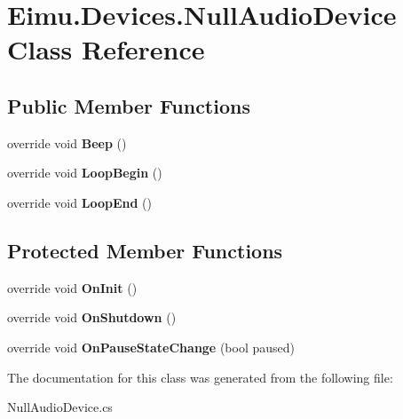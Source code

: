 \hypertarget{class_eimu_1_1_devices_1_1_null_audio_device}{
\section{Eimu.Devices.NullAudioDevice Class Reference}
\label{class_eimu_1_1_devices_1_1_null_audio_device}
}
\subsection*{Public Member Functions}
\begin{DoxyCompactItemize}
\item 
\hypertarget{class_eimu_1_1_devices_1_1_null_audio_device_a9393a3a1f846f2f2a292d171556a5da4}{
override void {\bfseries Beep} ()}
\label{class_eimu_1_1_devices_1_1_null_audio_device_a9393a3a1f846f2f2a292d171556a5da4}

\item 
\hypertarget{class_eimu_1_1_devices_1_1_null_audio_device_aad6598c1d94b7731bf6645c02cf49d21}{
override void {\bfseries LoopBegin} ()}
\label{class_eimu_1_1_devices_1_1_null_audio_device_aad6598c1d94b7731bf6645c02cf49d21}

\item 
\hypertarget{class_eimu_1_1_devices_1_1_null_audio_device_a5d11af7a1e07bc03343b4214944d9b95}{
override void {\bfseries LoopEnd} ()}
\label{class_eimu_1_1_devices_1_1_null_audio_device_a5d11af7a1e07bc03343b4214944d9b95}

\end{DoxyCompactItemize}
\subsection*{Protected Member Functions}
\begin{DoxyCompactItemize}
\item 
\hypertarget{class_eimu_1_1_devices_1_1_null_audio_device_a1b984e302c0353fd7f0a3c8a31f60229}{
override void {\bfseries OnInit} ()}
\label{class_eimu_1_1_devices_1_1_null_audio_device_a1b984e302c0353fd7f0a3c8a31f60229}

\item 
\hypertarget{class_eimu_1_1_devices_1_1_null_audio_device_ae590f41ecbd7069b62255c0bba0f716d}{
override void {\bfseries OnShutdown} ()}
\label{class_eimu_1_1_devices_1_1_null_audio_device_ae590f41ecbd7069b62255c0bba0f716d}

\item 
\hypertarget{class_eimu_1_1_devices_1_1_null_audio_device_a850d68590df5c430d32170968a57c59f}{
override void {\bfseries OnPauseStateChange} (bool paused)}
\label{class_eimu_1_1_devices_1_1_null_audio_device_a850d68590df5c430d32170968a57c59f}

\end{DoxyCompactItemize}


The documentation for this class was generated from the following file:\begin{DoxyCompactItemize}
\item 
NullAudioDevice.cs\end{DoxyCompactItemize}

